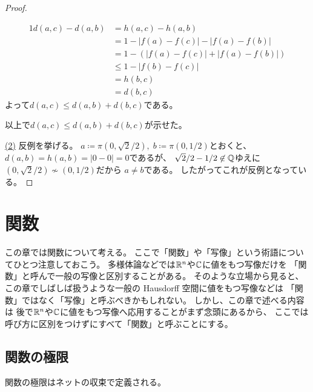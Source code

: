 \documentclass[report]{jlreq}
\begin{document}
\begin{proof}
\begin{itemize}
            \begin{alignat}{1}
                d(a, c) - d(a, b)
                    &= h(a, c) - h(a, b) \\
                    &= 1 - |f(a) - f(c)| - |f(a) - f(b)| \\
                    &= 1 - (|f(a) - f(c)| + |f(a) - f(b)|) \\
                    &\le 1 - |f(b) - f(c)| \\
                    &= h(b, c) \\
                    &= d(b, c)
            \end{alignat}
            よって$d(a, c) \le d(a, b) + d(b, c)$である。
    \end{itemize}
    以上で$d(a, c) \le d(a, b) + d(b, c)$が示せた。

    \uline{(2)} \quad
    反例を挙げる。
    $a \coloneqq \pi(0, \sqrt{2} / 2), \; b \coloneqq \pi(0, 1 / 2)$とおくと、
    $d(a, b) = h(a, b) = |0 - 0| = 0$であるが、
    $\sqrt{2} / 2 - 1 / 2 \not\in \mathbb{Q}$ゆえに
    $(0, \sqrt{2} / 2) \not\sim (0, 1 / 2)$だから
    $a \neq b$である。
    したがってこれが反例となっている。
\end{proof}






%
\chapter{関数}

この章では関数について考える。
ここで「関数」や「写像」という術語についてひとつ注意しておこう。
多様体論などでは$\mathbb{R}^n$や$\mathbb{C}$に値をもつ写像だけを
「関数」と呼んで一般の写像と区別することがある。
そのような立場から見ると、
この章でしばしば扱うような一般の Hausdorff 空間に値をもつ写像などは
「関数」ではなく「写像」と呼ぶべきかもしれない。
しかし、この章で述べる内容は
後で$\mathbb{R}^n$や$\mathbb{C}$に値をもつ写像へ応用することがまず念頭にあるから、
ここでは呼び方に区別をつけずにすべて「関数」と呼ぶことにする。

%
\section{関数の極限}

関数の極限はネットの収束で定義される。
\end{document}
